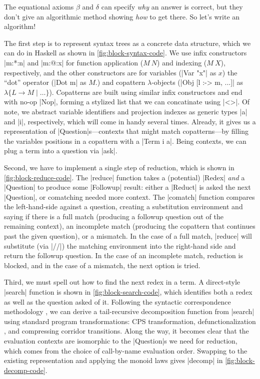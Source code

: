 \documentclass[sigplan,screen]{acmart}
\begin{document}
The equational axioms $\beta$ and $\delta$ can specify \emph{why} an answer is
correct, but they don't give an algorithmic method showing \emph{how} to get
there.  So let's write an algorithm!

The first step is to represent syntax trees as a concrete data structure, which
we can do in Haskell as shown in \cref{fig:block-syntax-code}.  We use infix
constructors \hs|m:*:n| and \hs|m:@:x| for function application ($M~N$) and
indexing ($M~X$), respectively, and the other constructors are for variables
(\hs|Var "x"| as $x$) the ``dot'' operator (\hs|Dot m| as $M.$) and copattern
$\lambda$-objects (\hs|Obj [l :-> m, ...]| as $\lambda\{L \to M \mid \dots\}$).
Copatterns are built using similar infix constructors and end with no-op
\hs|Nop|, forming a stylized list that we can concatinate using \hs|<>|.  Of
note, we abstract variable identifiers and projection indexes as generic types
\hs|a| and \hs|i|, respectively, which will come in handy several times.
Already, it gives us a representation of \hs|Question|s---contexts that might
match copatterns---by filling the variables positions in a copattern with a
\hs|Term i a|.  Being contexts, we can plug a term into a question via \hs|ask|.

Second, we have to implement a single step of reduction, which is shown in
\cref{fig:block-reduce-code}.  The \hs|reduce| function takes a (potential)
\hs|Redex| \emph{and} a \hs|Question| to produce some \hs|Followup| result:
either a \hs|Reduct| is asked the next \hs|Question|, or comatching needed more
context.  The \hs|comatch| function compares the left-hand-side against a
question, creating a substitution environment and saying if there is a full
match (producing a followup question out of the remaining context), an
incomplete match (producing the copattern that continues past the given
question), or a mismatch.  In the case of a full match, \hs|reduce| will
substitute (via \hs|//|) the matching environment into the right-hand side and
return the followup question.  In the case of an incomplete match, reduction is
blocked, and in the case of a mismatch, the next option is tried.

Third, we must spell out how to find the next redex in a term.  A direct-style
\hs|search| function is shown in \cref{fig:block-search-code}, which identifies
both a redex as well as the question asked of it.  Following the syntactic
correspondence methodology \cite{SyntacticCorrespondence}, we can derive a
tail-recursive decomposition function from \hs|search| using standard program
transformations: CPS transformation, defunctionalization
\cite{DefinitionalInterpreters}, and compressing corridor transitions.  Along
the way, it becomes clear that the evaluation contexts are isomorphic to the
\hs|Question|s we need for reduction, which comes from the choice of
call-by-name evaluation order.  Swapping to the existing representation and
applying the monoid laws gives \hs|decomp| in \cref{fig:block-decomp-code}.
\end{document}
